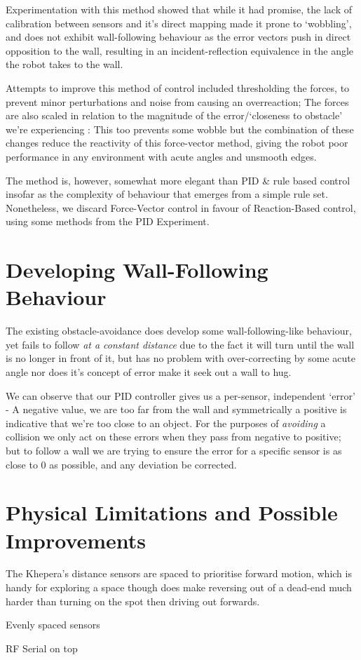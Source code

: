 \documentclass[11pt, a4paper]{article}
\begin{document}
Experimentation with this method showed that while it had promise, the lack of 
calibration between sensors and it's direct mapping made it prone to `wobbling', and does not
exhibit wall-following behaviour as the error vectors push in direct opposition to 
the wall, resulting in an incident-reflection equivalence in the angle the robot
takes to the wall.

Attempts to improve this method of control included thresholding the forces, to 
prevent minor perturbations and noise from causing an overreaction; The forces are 
also scaled in relation to the magnitude of the error/`closeness to obstacle' we're 
experiencing : This too prevents some wobble but the combination of these changes 
reduce the reactivity of this force-vector method, giving the robot poor performance 
in any environment with acute angles and unsmooth edges.

The method is, however, somewhat more elegant than PID \& rule based control insofar 
as the complexity of behaviour that emerges from a simple rule set. Nonetheless, we 
discard Force-Vector control in favour of Reaction-Based control, using some methods 
from the PID Experiment.


\section{Developing Wall-Following Behaviour}

The existing obstacle-avoidance does develop some wall-following-like behaviour, 
yet fails to follow \emph{at a constant distance} due to the fact it will turn until 
the wall is no longer in front of it, but has no problem with over-correcting by 
some acute angle nor does it's concept of error make it seek out a wall to hug.

We can observe that our PID controller gives us a per-sensor, independent `error' - 
A negative value, we are too far from the wall and symmetrically a positive is 
indicative that we're too close to an object. For the purposes of \emph{avoiding} 
a collision we only act on these errors when they pass from negative to positive; 
but to follow a wall we are trying to ensure the error for a specific sensor is 
as close to 0 as possible, and any deviation be corrected.


\section{Physical Limitations and Possible Improvements}

The Khepera's distance sensors are spaced to prioritise forward motion, which is handy 
for exploring a space though does make reversing out of a dead-end much harder than 
turning on the spot then driving out forwards.

Evenly spaced sensors

RF Serial on top
\end{document}
